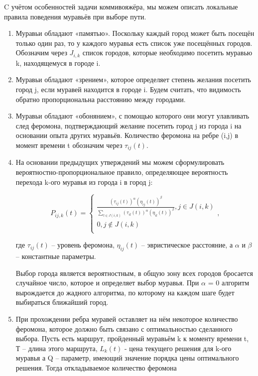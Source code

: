 \documentclass[12pt, a4paper]{report}
\begin{document}
	C учётом особенностей задачи коммивояжёра, мы можем описать локальные правила поведения муравьёв при выборе пути.
	\begin{enumerate}
		\item Муравьи обладают «памятью». Поскольку каждый город может быть посещён только один раз, то у каждого муравья есть список уже посещённых городов. Обозначим через $J_{i,k}$ список городов, которые необходимо посетить муравью k, находящемуся в городе i.
		
		\item Муравьи обладают «зрением», которое определяет степень желания посетить город j, если муравей находится в городе i. Будем считать, что видимость обратно пропорциональна расстоянию между городами.
		
		\item Муравьи обладают «обонянием», с помощью которого они могут улавливать след феромона, подтверждающий желание посетить город j из города i на основании опыта других муравьёв. Количество феромона на ребре (i,j) в момент времени t обозначим через $\tau_{ij}(t)$.
		
		\item На основании предыдущих утверждений мы можем сформулировать
		вероятностно-пропорциональное правило, определяющее вероятность
		перехода k-ого муравья из города i в город j:

		
		\begin{equation}
		\label{formula_pij}
		P_{ij,k}(t) =
		\begin{cases}
		\frac{(\tau_{ij}(t))^{\alpha}(\eta_{ij}(t))^{\beta}}{\sum\limits_{l \in J(i,k)}(\tau_{il}(t))^{\alpha}(\eta_{il}(t))^{\beta}}, j \in J(i,k)\\
		0, j \notin J(i,k)\\
		\end{cases},
		\end{equation}
		
		где $\tau_{ij}(t)$ – уровень феромона, $\eta_{ij}(t)$ – эвристическое расстояние, а $\alpha$ и $\beta$ – константные параметры.
		
		Выбор города является вероятностным, в общую зону всех городов
		бросается случайное число, которое и определяет выбор муравья. При
		$\alpha$ = 0 алгоритм вырождается до жадного алгоритма, по которому на
		каждом шаге будет выбираться ближайший город.
		\item При прохождении ребра муравей оставляет на нём некоторое количество феромона, которое должно быть связано с оптимальностью сделанного выбора. Пусть есть маршрут, пройденный муравьём k к моменту времени t, Т – длина этого маршрута, $L_{k}(t)$ - цена текущего решения для k-ого муравья а Q – параметр, имеющий значение порядка цены оптимального решения.
		Тогда откладываемое количество феромона
		

\end{enumerate}
\end{document}
